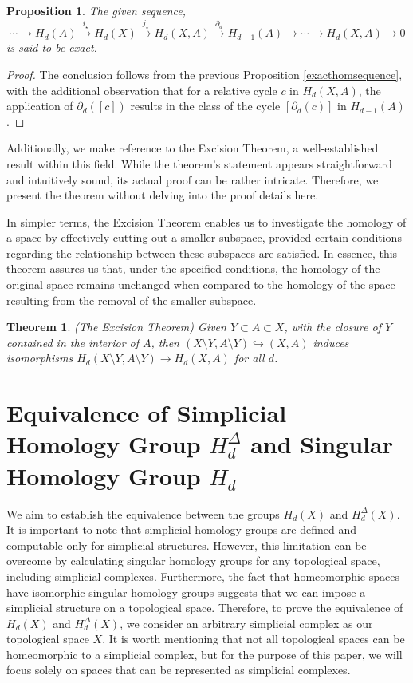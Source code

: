 \documentclass{amsart}
\newtheorem{theorem}{Theorem}
\newtheorem{proposition}[definition]{Proposition}
\begin{document}
\begin{proposition}
The given sequence,
\begin{equation*}
\cdots \rightarrow H_d(A) \xrightarrow{i_\star} H_d(X) \xrightarrow{j_\star} H_d(X,A) \xrightarrow{\partial_d} H_{d-1}(A) \rightarrow \cdots \rightarrow H_d(X,A) \rightarrow 0
\end{equation*}
is said to be exact.
\end{proposition}

\begin{proof}
The conclusion follows from the previous Proposition \ref{exacthomsequence}, with the additional observation that for a relative cycle $c$ in $H_d(X,A)$, the application of $\partial_d([c])$ results in the class of the cycle $[\partial_d(c)]$ in $H_{d-1}(A)$.
\end{proof}

Additionally, we make reference to the Excision Theorem, a well-established result within this field. While the theorem's statement appears straightforward and intuitively sound, its actual proof can be rather intricate. Therefore, we present the theorem without delving into the proof details here.

In simpler terms, the Excision Theorem enables us to investigate the homology of a space by effectively \glqq cutting out\grqq{} a smaller subspace, provided certain conditions regarding the relationship between these subspaces are satisfied. In essence, this theorem assures us that, under the specified conditions, the homology of the original space remains unchanged when compared to the homology of the space resulting from the removal of the smaller subspace.

\begin{theorem}{(The Excision Theorem)}
\label{excisiontheorem}
Given $Y \subset A \subset X$, with the closure of $Y$ contained in the interior of $A$, then $(X\setminus Y, A \setminus Y) \hookrightarrow (X,A)$ induces isomorphisms $H_d(X\setminus Y, A\setminus Y) \rightarrow H_d(X,A)$ for all $d$.
\end{theorem}

\section{Equivalence of Simplicial Homology Group $H_d^\Delta$ and Singular Homology Group $H_d$}
We aim to establish the equivalence between the groups $H_d(X)$ and $H^\Delta_d(X)$. It is important to note that simplicial homology groups are defined and computable only for simplicial structures. However, this limitation can be overcome by calculating singular homology groups for any topological space, including simplicial complexes. Furthermore, the fact that homeomorphic spaces have isomorphic singular homology groups suggests that we can impose a simplicial structure on a topological space. Therefore, to prove the equivalence of $H_d(X)$ and $H^\Delta_d(X)$, we consider an arbitrary simplicial complex as our topological space $X$. It is worth mentioning that not all topological spaces can be homeomorphic to a simplicial complex, but for the purpose of this paper, we will focus solely on spaces that can be represented as simplicial complexes.
\end{document}
